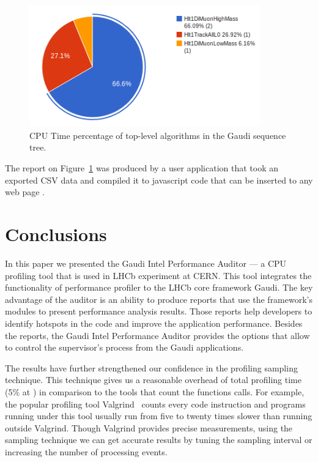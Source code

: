 \documentclass[a4paper]{jpconf}
\begin{document}
\begin{figure}[H]
\begin{minipage}{\textwidth}
\begin{center}
\includegraphics[width=100mm]{figs/fig12.png}
\caption{\label{fig12}CPU Time percentage of top-level algorithms in the Gaudi sequence tree.}
\end{center}
\end{minipage}
\end{figure}

The report on Figure~\ref{fig12} was produced by a user application that took an exported CSV data and compiled it to 
javascript code that can be inserted to any web page \cite{reports}.

\section{Conclusions}
In this paper we presented the Gaudi Intel Performance Auditor --- a CPU profiling tool that is used 
in LHCb experiment at CERN. This tool integrates the functionality of \iamp performance profiler to 
the LHCb core framework Gaudi. The key advantage of the auditor is an ability to produce reports that use 
the framework's modules to present performance analysis results. Those reports help  developers to identify hotspots in 
the code and improve the application performance. Besides the reports, the Gaudi Intel Performance Auditor provides 
the options that allow to control the \iamp supervisor’s process from the Gaudi applications.

The results have further strengthened our confidence in the profiling sampling technique. This technique gives us 
a reasonable overhead of total profiling time (5\% at \iamp) in comparison to the tools that count the functions calls. 
For example, the popular profiling tool Valgrind~\cite{valgrind} counts every code instruction and programs running 
under this tool usually run from five to twenty times  slower than running outside Valgrind. Though Valgrind provides 
 precise measurements, using the sampling technique we can get accurate results by tuning the sampling interval or 
increasing the number of processing events.
\end{document}
